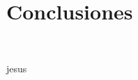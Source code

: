 \section{Conclusiones} 
\textbf{}\\
\begin{flushleft}


\begin{itemize}


jesus

	


\end{itemize} 


\end{flushleft}